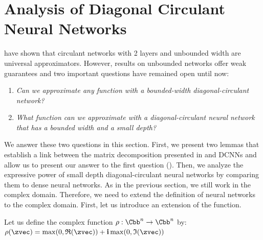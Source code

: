 


 \section{Analysis of Diagonal Circulant Neural Networks}
\label{section:ch4-analysis_of_diagonal_circulant_neural_networks}

\citet{zhao2017theoretical} have shown that circulant networks with 2 layers and unbounded width are universal approximators.
However, results on unbounded networks offer weak guarantees and two important questions have remained open until now: 
\begin{enumerate}
  \item \emph{Can we approximate any function with a bounded-width diagonal-circulant network?}
  \item \emph{What function can we approximate with a diagonal-circulant neural network that has a bounded width and a small depth?}
\end{enumerate}
We answer these two questions in this section.
First, we present two lemmas that establish a link between the matrix decomposition presented in  and DCNNs and allow us to present our answer to the first question ().
Then, we analyze the expressive power of small depth diagonal-circulant neural networks by comparing them to dense neural networks. 
As in the previous section, we still work in the complex domain.
Therefore, we need to extend the definition of neural networks to the complex domain.
First, let us introduce an extension of the \relu function.

\begin{definition} \label{definition:relu_function}
  Let us define the complex \relu function $\rho: \Cbb^n \rightarrow \Cbb^n$ by: $\rho(\zvec) = \max\left(0, \mathfrak{R}(\zvec)\right) + \ci \max\left(0, \mathfrak{I}(\zvec) \right)$
\end{definition}

